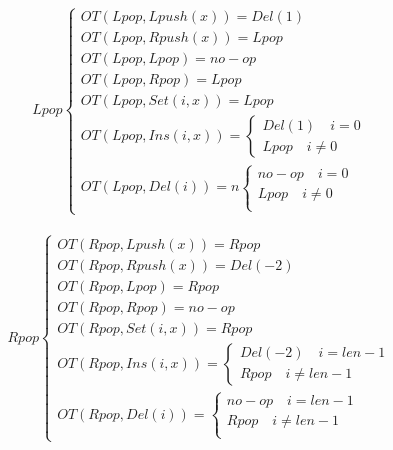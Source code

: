 \documentclass[a4paper,UTF8]{article}
\begin{document}
\begin{equation}
\begin{aligned}
Lpop \begin{cases}
OT(Lpop,Lpush(x))={Del(1)}\\
OT(Lpop,Rpush(x))={Lpop}\\
OT(Lpop,Lpop)=
{no-op} \\
OT(Lpop,Rpop)=
{Lpop} \\
OT(Lpop,Set(i,x))=
{Lpop}\\
OT(Lpop,Ins(i,x))=\begin{cases}
{Del(1)} \quad i=0\\
{Lpop}  \quad i \neq 0 \end{cases}\\
OT(Lpop,Del(i))=n\begin{cases}
{no-op} \quad i=0\\
{Lpop} \quad i\neq 0\\\end{cases}
\end{cases}
\end{aligned}
\end{equation}


\begin{equation}
\begin{aligned}
Rpop \begin{cases}
OT(Rpop,Lpush(x))={Rpop}\\
OT(Rpop,Rpush(x))={Del(-2)}\\
OT(Rpop,Lpop)=
{Rpop}\\
OT(Rpop,Rpop)=
{no-op}\\
OT(Rpop,Set(i,x))=
{Rpop}\\
OT(Rpop,Ins(i,x))=\begin{cases}
{Del(-2)}  \quad i=len-1\\
{Rpop} \quad  i \neq len-1\end{cases}\\
OT(Rpop,Del(i))=\begin{cases}
{no-op}  \quad i=len-1\\
{Rpop}  \quad i \neq len-1\\\end{cases}
\end{cases}
\end{aligned}
\end{equation}
\end{document}
